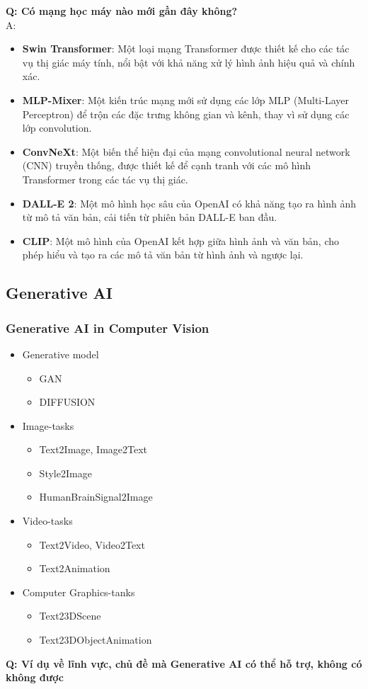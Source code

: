 \textbf{Q: Có mạng học máy nào mới gần đây không?}\\
A: 
\begin{itemize}
    \item \textbf{Swin Transformer}: Một loại mạng Transformer được thiết kế cho các tác vụ thị giác máy tính, nổi bật với khả năng xử lý hình ảnh hiệu quả và chính xác.
    \item \textbf{MLP-Mixer}: Một kiến trúc mạng mới sử dụng các lớp MLP (Multi-Layer Perceptron) để trộn các đặc trưng không gian và kênh, thay vì sử dụng các lớp convolution.
    \item \textbf{ConvNeXt}: Một biến thể hiện đại của mạng convolutional neural network (CNN) truyền thống, được thiết kế để cạnh tranh với các mô hình Transformer trong các tác vụ thị giác.
    \item \textbf{DALL-E 2}: Một mô hình học sâu của OpenAI có khả năng tạo ra hình ảnh từ mô tả văn bản, cải tiến từ phiên bản DALL-E ban đầu.
    \item \textbf{CLIP}: Một mô hình của OpenAI kết hợp giữa hình ảnh và văn bản, cho phép hiểu và tạo ra các mô tả văn bản từ hình ảnh và ngược lại.
\end{itemize}


\subsection{Generative AI}
\subsubsection{Generative AI in Computer Vision}
\begin{itemize}
    \item Generative model
    \begin{itemize}
        \item GAN
        \item DIFFUSION
    \end{itemize}
    \item Image-tasks
    \begin{itemize}
        \item Text2Image, Image2Text
        \item Style2Image
        \item HumanBrainSignal2Image
    \end{itemize}
    \item Video-tasks
    \begin{itemize}
        \item Text2Video, Video2Text
        \item Text2Animation
    \end{itemize}
    \item Computer Graphics-tanks
    \begin{itemize}
        \item Text23DScene
        \item Text23DObjectAnimation
    \end{itemize}
\end{itemize}
\textbf{Q: Ví dụ về lĩnh vực, chủ đề mà Generative AI có thể hỗ trợ, không có không được}

